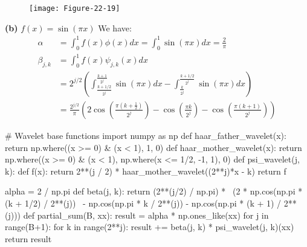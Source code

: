 \begin{figure}[H]
\centering
\texttt{[image: Figure-22-19]}
\end{figure}

\textbf{(b)} \(f(x) = \sin(\pi x)\)
We have:
\begin{align*}
\alpha &= \int_{0}^{1} f(x) \phi(x) dx = \int_{0}^{1} \sin (\pi x) dx = \frac{2}{\pi} \\
\beta_{j, k} &= \int_{0}^{1} f(x) \psi_{j, k}(x) dx \\
&= 2^{j/2} \left( \int_{\frac{k + 1/2}{2^{j}}}^{\frac{k + 1}{2^{j}}} \sin(\pi x) dx - \int_{\frac{k}{2^{j}}}^{\frac{k + 1/2}{2^{j}}} \sin(\pi x) dx \right) \\
&= \frac{2^{j/2}}{\pi} \left(
 2 \cos\left( \frac{\pi \left(k + \frac{1}{2}\right)}{2^{j}} \right) 
 - \cos\left( \frac{\pi k}{2^{j}} \right)
 - \cos\left( \frac{\pi (k + 1)}{2^{j}} \right) 
\right)
\end{align*}

\begin{python}
# Wavelet base functions
import numpy as np
def haar_father_wavelet(x):
    return np.where((x >= 0) & (x < 1), 1, 0)
def haar_mother_wavelet(x):
    return np.where((x >= 0) & (x < 1), np.where(x <= 1/2, -1, 1), 0)
def psi_wavelet(j, k):
    def f(x):
        return 2**(j / 2) * haar_mother_wavelet((2**j)*x - k)
    return f
\end{python}

\begin{python}
alpha = 2 / np.pi
def beta(j, k):
    return (2**(j/2) / np.pi) *  \
            (2 * np.cos(np.pi * (k + 1/2) / 2**(j)) \
            - np.cos(np.pi * k / 2**(j)) - np.cos(np.pi * (k + 1) / 2**(j)))
def partial_sum(B, xx):
    result = alpha * np.ones_like(xx)
    for j in range(B+1):
        for k in range(2**j):
            result += beta(j, k) * psi_wavelet(j, k)(xx)
    return result
\end{python}


